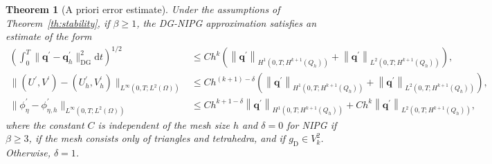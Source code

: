 \documentclass[pdflatex,sn-mathphys-num]{sn-jnl}%
\theoremstyle{thmstyleone}%
\newtheorem{theorem}{Theorem}%
\theoremstyle{thmstyletwo}%
\theoremstyle{thmstylethree}%
\begin{document}
\begin{theorem}[A priori error estimate]
\label{th:error}
Under the assumptions of Theorem~\ref{th:stability}, if $\beta \ge 1$, the DG-NIPG approximation satisfies an estimate of the form
\begin{equation}
\label{error}
\begin{aligned}
\left(\int_0^T\|\mathbf{q}^\prime-\mathbf{q}_h^{\prime}\|_{\mathrm{DG}}^2 \mathrm{d} t\right)^{1/2}  &\le Ch^{k}\left(\left\|\mathbf{q}^\prime\right\|_{H^1(0,T;H^{k+1}(Q_h))} +
\left\|\mathbf{q}^\prime  \right\|_{L^2(0,T;H^{k+1}(Q_h))} \right),\\
\|(U^{\prime},V^\prime)-(U_h^{\prime},V_h^\prime)\|_{L^\infty(0,T;L^2(\Omega))}  &\le Ch^{(k+1)-\delta}\left(\left\|\mathbf{q}^\prime\right\|_{H^1(0,T;H^{k+1}(Q_h))} +
\left\|\mathbf{q}^\prime  \right\|_{L^2(0,T;H^{k+1}(Q_h))} \right),\\
\|\phi_\eta^\prime-\phi_{\eta,h}^\prime\|_{L^\infty(0,T;L^2(\Omega))}  &\le Ch^{k+1-\delta}\left\| \mathbf{q}^\prime\right\|_{H^1(0,T;H^{k+1}(Q_h))} +Ch^{k}
\left\|\mathbf{q}^\prime  \right\|_{L^2(0,T;H^{k+1}(Q_h))},
\end{aligned}
\end{equation}
where the constant $C$ is independent of the mesh size $h$ and $\delta=0$ for NIPG if $\beta \geq 3$, if the mesh consists only of triangles and tetrahedra, and if $g_{\mathrm{D}} \in V_k^2$. Otherwise, $\delta=1$.
\end{theorem}
\end{document}
